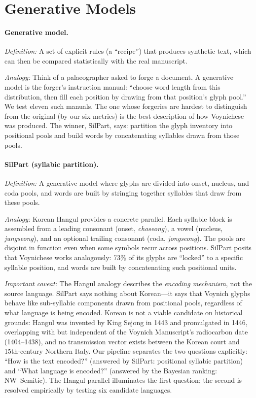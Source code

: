 \documentclass[11pt,a4paper]{article}
\newcommand{\vms}{Voynich Manuscript}
\begin{document}
\section{Generative Models}

\paragraph{Generative model.}
\textit{Definition:} A set of explicit rules (a ``recipe'') that produces synthetic text, which can then be compared statistically with the real manuscript.

\textit{Analogy:} Think of a palaeographer asked to forge a document.  A generative model is the forger's instruction manual: ``choose word length from this distribution, then fill each position by drawing from that position's glyph pool.''  We test eleven such manuals.  The one whose forgeries are hardest to distinguish from the original (by our six metrics) is the best description of how Voynichese was produced.  The winner, SilPart, says: partition the glyph inventory into positional pools and build words by concatenating syllables drawn from those pools.

\paragraph{SilPart (syllabic partition).}
\textit{Definition:} A generative model where glyphs are divided into onset, nucleus, and coda pools, and words are built by stringing together syllables that draw from these pools.

\textit{Analogy:} Korean Hangul provides a concrete parallel.  Each syllable block is assembled from a leading consonant (onset, \textit{choseong}), a vowel (nucleus, \textit{jungseong}), and an optional trailing consonant (coda, \textit{jongseong}).  The pools are disjoint in function even when some symbols recur across positions.  SilPart posits that Voynichese works analogously: 73\% of its glyphs are ``locked'' to a specific syllable position, and words are built by concatenating such positional units.

\textit{Important caveat:} The Hangul analogy describes the \emph{encoding mechanism}, not the source language.  SilPart says nothing about Korean---it says that Voynich glyphs behave like sub-syllabic components drawn from positional pools, regardless of what language is being encoded.  Korean is not a viable candidate on historical grounds: Hangul was invented by King Sejong in 1443 and promulgated in 1446, overlapping with but independent of the \vms{}'s radiocarbon date (1404--1438), and no transmission vector exists between the Korean court and 15th-century Northern Italy.  Our pipeline separates the two questions explicitly: ``How is the text encoded?'' (answered by SilPart: positional syllabic partition) and ``What language is encoded?'' (answered by the Bayesian ranking: NW~Semitic).  The Hangul parallel illuminates the first question; the second is resolved empirically by testing six candidate languages.
\end{document}
